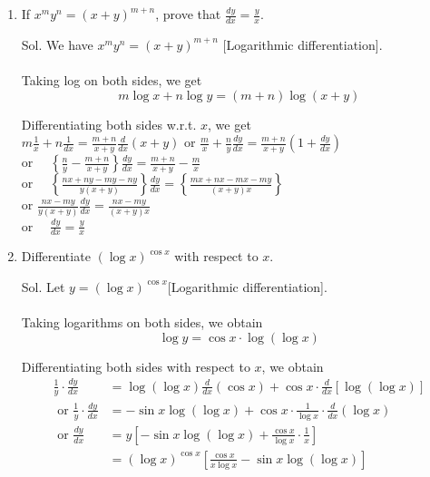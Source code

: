 \begin{enumerate}
\begin{outline}
\end{outline}


\item If $x^m y^n=(x+y)^{m+n}$, prove that $\frac{d y}{d x}=\frac{y}{x}$.


\begin{outline}
    Sol. We have $x^m y^n=(x+y)^{m+n}$ [Logarithmic differentiation].\\\\
Taking log on both sides, we get
$$
m \log x+n \log y=(m+n) \log (x+y)
$$

Differentiating both sides w.r.t. $x$, we get\\
$m \frac{1}{x}+n \frac{1}{d x}=\frac{m+n}{x+y} \frac{d}{d x}(x+y)$ or $\frac{m}{x}+\frac{n}{y} \frac{d y}{d x}=\frac{m+n}{x+y}\left(1+\frac{d y}{d x}\right)$\\
or $\quad\left\{\frac{n}{y}-\frac{m+n}{x+y}\right\} \frac{d y}{d x}=\frac{m+n}{x+y}-\frac{m}{x}$\\
or $\quad\left\{\frac{n x+n y-m y-n y}{y(x+y)}\right\} \frac{d y}{d x}=\left\{\frac{m x+n x-m x-m y}{(x+y) x}\right\}$\\
or $\frac{n x-m y}{y(x+y)} \frac{d y}{d x}=\frac{n x-m y}{(x+y) x}$\\
or $\quad \frac{d y}{d x}=\frac{y}{x}$
\end{outline}



\item Differentiate $(\log x)^{\cos x}$ with respect to $x$.


\begin{outline}
    Sol. Let $y=(\log x)^{\cos x}$[Logarithmic differentiation].\\\\
Taking logarithms on both sides, we obtain
$$
\log y=\cos x \cdot \log (\log x)
$$

Differentiating both sides with respect to $x$, we obtain
$$
\begin{aligned}
\frac{1}{y} \cdot \frac{d y}{d x} & =\log (\log x) \frac{d}{d x}(\cos x)+\cos x \cdot \frac{d}{d x}[\log (\log x)] \\
\text { or } \frac{1}{y} \cdot \frac{d y}{d x} & =-\sin x \log (\log x)+\cos x \cdot \frac{1}{\log x} \cdot \frac{d}{d x}(\log x) \\
\text { or } \frac{d y}{d x} & =y\left[-\sin x \log (\log x)+\frac{\cos x}{\log x} \cdot \frac{1}{x}\right] \\
& =(\log x)^{\cos x}\left[\frac{\cos x}{x \log x}-\sin x \log (\log x)\right]
\end{aligned}
$$
\end{outline}



\end{enumerate}
